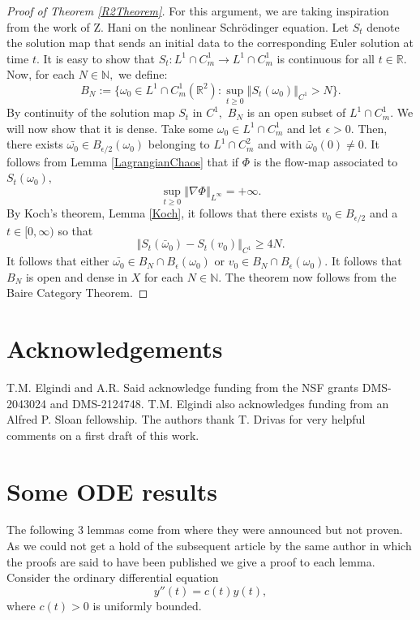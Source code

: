 \documentclass[10pt]{article}
\numberwithin{equation}{section}
\theoremstyle{plain}
\theoremstyle{definition}
\newcommand{\norm}[1]{\left\Vert #1 \right\Vert}
\numberwithin{equation}{section}
\begin{document}
\begin{proof}[Proof of Theorem \ref{R2Theorem}]
For this argument, we are taking inspiration from the work of Z. Hani \cite{Hani} on the nonlinear Schr\"odinger equation. 
Let $S_t$ denote the solution map that sends an initial data to the corresponding Euler solution at time $t$. It is easy to show that $S_t:L^1\cap C^1_m\rightarrow L^1\cap C^1_m$ is continuous for all $t\in\mathbb{R}.$ Now, for each $N\in\mathbb{N},$ we define:
\[B_N:=\{\omega_0\in L^1\cap C^1_m(\mathbb{R}^2): \sup_{t\geq 0}\norm{S_t(\omega_0)}_{C^1}>N\}.\] By continuity of the solution map $S_t$ in $C^1,$ $B_N$ is an open subset of $L^1\cap C^{1}_m.$ We will now show that it is dense. Take some $\omega_0\in L^1\cap C^1_m$ and let $\epsilon>0.$ Then, there exists $\bar{\omega_0}\in B_{\epsilon/2}(\omega_0)$ belonging to $L^1\cap C^2_m$ and with $\bar\omega_0(0)\not=0.$ It follows from Lemma \ref{LagrangianChaos} that if $\Phi$ is the flow-map associated to $S_t(\omega_0),$
\[\sup_{t\geq 0}\norm{\nabla\Phi}_{L^\infty}=+\infty.\] By Koch's theorem, Lemma \ref{Koch}, it follows that there exists $v_0\in B_{\epsilon/2}$ and a $t\in [0,\infty)$ so that 
\[\norm{S_t(\bar\omega_0)-S_t(v_0)}_{C^1}\geq 4N.\] It follows that either $\bar{\omega_0}\in B_N\cap B_{\epsilon}(\omega_0)$ or $v_0\in B_N\cap B_\epsilon(\omega_0).$ It follows that $B_N$ is open and dense in $X$ for each $N\in\mathbb{N}$. The theorem now follows from the Baire Category Theorem. 
\end{proof}



\section*{Acknowledgements}
T.M. Elgindi and A.R. Said acknowledge funding from the NSF grants DMS-2043024 and
DMS-2124748. T.M. Elgindi also acknowledges funding from an Alfred P. Sloan fellowship. The authors thank T. Drivas for very helpful comments on a first draft of this work. 


\appendix
\section{Some ODE results}
The following 3 lemmas come from \cite{Sobol49} where they were announced but not proven. As we could not get a hold of the subsequent article by the same author in which the proofs are said to have been published we give a proof to each lemma.
Consider the ordinary differential equation \begin{equation}
\label{YEqn} y''(t)=c(t)y(t),
\end{equation} where $c(t)>0$ is uniformly bounded.
\end{document}
